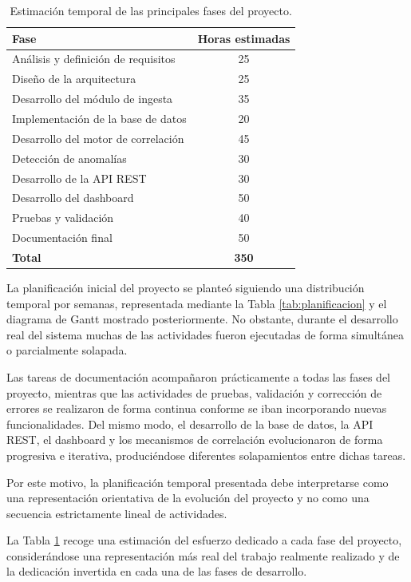 \begin{table}[htbp]
	\centering
	\begin{tabular}{|l|c|}
		\hline
		\textbf{Fase} & \textbf{Horas estimadas} \\
		\hline
		Análisis y definición de requisitos & 25 \\
		Diseño de la arquitectura & 25 \\
		Desarrollo del módulo de ingesta & 35 \\
		Implementación de la base de datos & 20 \\
		Desarrollo del motor de correlación & 45 \\
		Detección de anomalías & 30 \\
		Desarrollo de la API REST & 30 \\
		Desarrollo del dashboard & 50 \\
		Pruebas y validación & 40 \\
		Documentación final & 50 \\
		\hline
		\textbf{Total} & \textbf{350} \\
		\hline
	\end{tabular}
	\caption{Estimación temporal de las principales fases del proyecto.}
	\label{tab:horas}
\end{table}

La planificación inicial del proyecto se planteó siguiendo una distribución temporal por semanas, representada mediante la Tabla \ref{tab:planificacion} y el diagrama de Gantt mostrado posteriormente. No obstante, durante el desarrollo real del sistema muchas de las actividades fueron ejecutadas de forma simultánea o parcialmente solapada.

Las tareas de documentación acompañaron prácticamente a todas las fases del proyecto, mientras que las actividades de pruebas, validación y corrección de errores se realizaron de forma continua conforme se iban incorporando nuevas funcionalidades. Del mismo modo, el desarrollo de la base de datos, la API REST, el dashboard y los mecanismos de correlación evolucionaron de forma progresiva e iterativa, produciéndose diferentes solapamientos entre dichas tareas.

Por este motivo, la planificación temporal presentada debe interpretarse como una representación orientativa de la evolución del proyecto y no como una secuencia estrictamente lineal de actividades.

La Tabla \ref{tab:horas} recoge una estimación del esfuerzo dedicado a cada fase del proyecto, considerándose una representación más real del trabajo realmente realizado y de la dedicación invertida en cada una de las fases de desarrollo.


